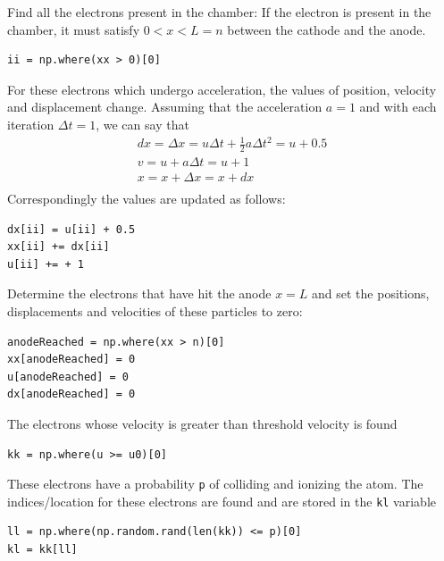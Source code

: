 \documentclass[12pt, a4paper]{report}
\begin{document}
Find all the electrons present in the chamber: If the electron is present in the chamber, it must satisfy $0 < x < L = n$ between the cathode and the anode.
\begin{verbatim}
ii = np.where(xx > 0)[0]
\end{verbatim}
For these electrons which undergo acceleration, the values of position, velocity and displacement change. Assuming that the acceleration $a=1$ and with each iteration $\Delta t = 1$, we can say that
\begin{align*}
dx = \Delta x = u\Delta t + \frac{1}{2}a\Delta t^2 = u + 0.5\\
v = u + a\Delta t = u + 1\\
x = x + \Delta x = x + dx\\
 \end{align*}
Correspondingly the values are updated as follows:
\begin{verbatim}
dx[ii] = u[ii] + 0.5
xx[ii] += dx[ii]
u[ii] += + 1
\end{verbatim}
Determine the electrons that have hit the anode $x = L$ and set the positions, displacements and velocities of these particles to zero:
\begin{verbatim}
anodeReached = np.where(xx > n)[0]
xx[anodeReached] = 0
u[anodeReached] = 0
dx[anodeReached] = 0
\end{verbatim}
The electrons whose velocity is greater than threshold velocity is found 
\begin{verbatim}
kk = np.where(u >= u0)[0]                         
\end{verbatim}
These electrons have a probability \texttt{p} of colliding and ionizing the atom. The indices/location for these electrons are found and are stored in the \texttt{kl} variable
\begin{verbatim}
ll = np.where(np.random.rand(len(kk)) <= p)[0]    
kl = kk[ll]                                       
\end{verbatim}
\end{document}
